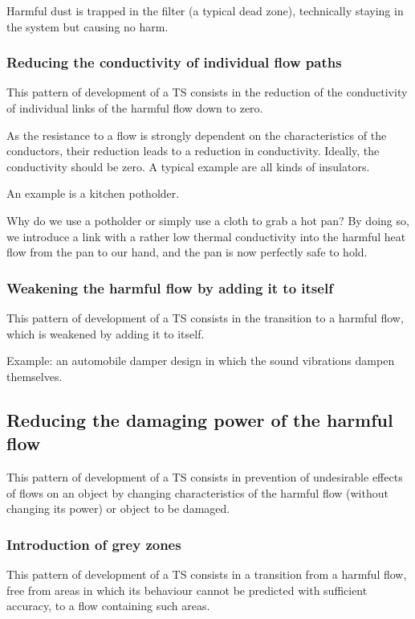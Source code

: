 \documentclass[a4paper,11pt]{article}
\begin{document}
Harmful dust is trapped in the filter (a typical dead zone), technically
staying in the system but causing no harm.

\subsubsection{Reducing the conductivity of individual flow paths}

This pattern of development of a TS consists in the reduction of the
conductivity of individual links of the harmful flow down to zero.

As the resistance to a flow is strongly dependent on the characteristics of
the conductors, their reduction leads to a reduction in conductivity. Ideally,
the conductivity should be zero. A typical example are all kinds of
insulators.

An example is a kitchen potholder.

Why do we use a potholder or simply use a cloth to grab a hot pan? By doing
so, we introduce a link with a rather low thermal conductivity into the
harmful heat flow from the pan to our hand, and the pan is now perfectly safe
to hold.

\subsubsection{Weakening the harmful flow by adding it to itself}

This pattern of development of a TS consists in the transition to a harmful
flow, which is weakened by adding it to itself.

Example: an automobile damper design in which the sound vibrations dampen
themselves.

\subsection{Reducing the damaging power of the harmful flow}

This pattern of development of a TS consists in prevention of undesirable
effects of flows on an object by changing characteristics of the harmful flow
(without changing its power) or object to be damaged.

\subsubsection{Introduction of grey zones}

This pattern of development of a TS consists in a transition from a harmful
flow, free from areas in which its behaviour cannot be predicted with
sufficient accuracy, to a flow containing such areas.
\end{document}
